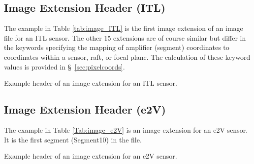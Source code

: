 \documentclass{article}[12pt]
\newcommand{\red}{\textcolor{red}}
\begin{document}
{%

\subsection{Image Extension Header (ITL)}
The example in Table \ref{tab:image_ITL} is the first image extension of an image file for an ITL sensor.  The other 15 extensions are of course similar but differ in the keywords specifying the mapping of amplifier (segment) coordinates to coordinates within a sensor, raft, or focal plane.  The calculation of these keyword values is provided in \S~\ref{sec:pixelcoords}.

\begin{table}
\tiny
\begin{alltt}

\end{alltt}
\caption{Example header of an image extension for an ITL sensor. \label{tab:image_ITL}}
\end{table}

\subsection{Image Extension Header (e2V)}

The example in Table \ref{Tab:image_e2V} is an image extension for an e2V sensor.  It is the first segment (Segment10) in the file.

\begin{table}
\tiny
\begin{alltt}

\end{alltt}
\caption{Example header of an image extension for an e2V sensor.\label{tab:image_e2V}}
\end{table}

}
\end{document}
